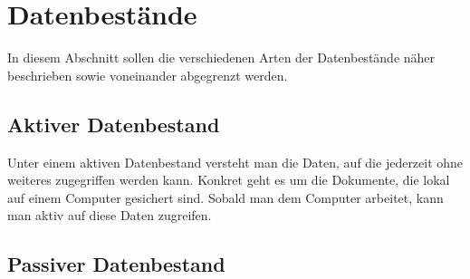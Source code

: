 

\section{Datenbestände}

In diesem Abschnitt sollen die verschiedenen Arten der Datenbestände näher
beschrieben sowie voneinander abgegrenzt werden.

\subsection{Aktiver Datenbestand}

Unter einem aktiven Datenbestand versteht man die Daten, auf die jederzeit
ohne weiteres zugegriffen werden kann. Konkret geht es um die Dokumente, die
lokal auf einem Computer gesichert sind. Sobald man dem Computer arbeitet,
kann man aktiv auf diese Daten zugreifen.

\subsection{Passiver Datenbestand}

